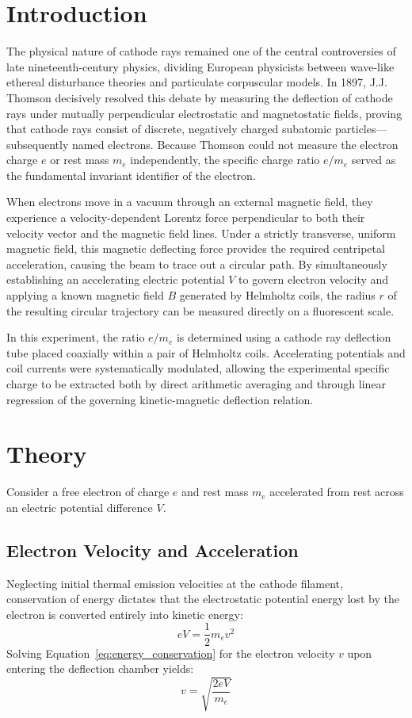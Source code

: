 \documentclass[journal]{IEEEtran}
\begin{document}
\section{Introduction}
The physical nature of cathode rays remained one of the central controversies of late nineteenth-century physics, dividing European physicists between wave-like ethereal disturbance theories and particulate corpuscular models. In 1897, J.J. Thomson decisively resolved this debate by measuring the deflection of cathode rays under mutually perpendicular electrostatic and magnetostatic fields, proving that cathode rays consist of discrete, negatively charged subatomic particles—subsequently named electrons. Because Thomson could not measure the electron charge $e$ or rest mass $m_e$ independently, the specific charge ratio $e/m_e$ served as the fundamental invariant identifier of the electron.

When electrons move in a vacuum through an external magnetic field, they experience a velocity-dependent Lorentz force perpendicular to both their velocity vector and the magnetic field lines. Under a strictly transverse, uniform magnetic field, this magnetic deflecting force provides the required centripetal acceleration, causing the beam to trace out a circular path. By simultaneously establishing an accelerating electric potential $V$ to govern electron velocity and applying a known magnetic field $B$ generated by Helmholtz coils, the radius $r$ of the resulting circular trajectory can be measured directly on a fluorescent scale.

In this experiment, the ratio $e/m_e$ is determined using a cathode ray deflection tube placed coaxially within a pair of Helmholtz coils. Accelerating potentials and coil currents were systematically modulated, allowing the experimental specific charge to be extracted both by direct arithmetic averaging and through linear regression of the governing kinetic-magnetic deflection relation.

\section{Theory}
Consider a free electron of charge $e$ and rest mass $m_e$ accelerated from rest across an electric potential difference $V$.

\subsection{Electron Velocity and Acceleration}
Neglecting initial thermal emission velocities at the cathode filament, conservation of energy dictates that the electrostatic potential energy lost by the electron is converted entirely into kinetic energy:
\begin{equation}
    e V = \frac{1}{2} m_e v^2
    \label{eq:energy_conservation}
\end{equation}
Solving Equation~\eqref{eq:energy_conservation} for the electron velocity $v$ upon entering the deflection chamber yields:
\begin{equation}
    v = \sqrt{\frac{2 e V}{m_e}}
    \label{eq:velocity}
\end{equation}
\end{document}

